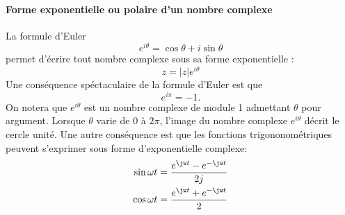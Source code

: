 \paragraph{Forme exponentielle ou polaire d'un nombre complexe}
La formule d'Euler 
$$
e^{i\theta}=\cos\theta+i\sin\theta
$$
permet d'écrire tout nombre complexe sous sa forme exponentielle : 
$$
z=|z|e^{i\theta}
$$
Une conséquence spéctaculaire de la formule d'Euler est que
$$
e^{i\pi}=-1.
$$
On notera que $e^{i\theta}$ est un nombre complexe de module 1 admettant 
$\theta$ pour argument. Lorsque $\theta$ varie de $0$ à $2\pi$, l'image du 
nombre complexe $e^{i\theta}$ décrit le cercle unité.
Une autre conséquence est que les fonctions trigononométriques peuvent 
s'exprimer sous forme d'exponentielle complexe:
\begin{align*}
    \sin{\omega t}&=\dfrac{e^{\jw t}-e^{-\jw t}}{2j} \\
    \cos{\omega t}&=\dfrac{e^{\jw t}+e^{-\jw t}}{2}
\end{align*}

